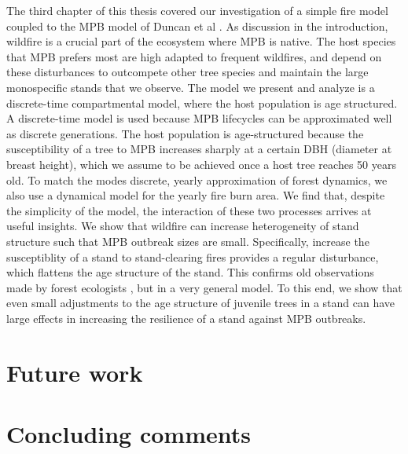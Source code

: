 The third chapter of this thesis covered our investigation of a simple fire model coupled to the MPB model of Duncan et al \cite{duncan2015model}. As discussion in the introduction, wildfire is a crucial part of the ecosystem where MPB is native. The host species that MPB prefers most are high adapted to frequent wildfires, and depend on these disturbances to outcompete other tree species and maintain the large monospecific stands that we observe. The model we present and analyze is a discrete-time compartmental model, where the host population is age structured. A discrete-time model is used because MPB lifecycles can be approximated well as discrete generations. The host population is age-structured because the susceptibility of a tree to MPB increases sharply at a certain DBH (diameter at breast height), which we assume to be achieved once a host tree reaches 50 years old. To match the modes discrete, yearly approximation of forest dynamics, we also use a dynamical model for the yearly fire burn area. We find that, despite the simplicity of the model, the interaction of these two processes arrives at useful insights. We show that wildfire can increase heterogeneity of stand structure such that MPB outbreak sizes are small. Specifically, increase the susceptiblity of a stand to stand-clearing fires provides a regular disturbance, which flattens the age structure of the stand. This confirms old observations made by forest ecologists \cite{kaufmann2008status, seidl2016spatial}, but in a very general model. To this end, we show that even small adjustments to the age structure of juvenile trees in a stand can have large effects in increasing the resilience of a stand against MPB outbreaks.     





\section{Future work}



\section{Concluding comments}